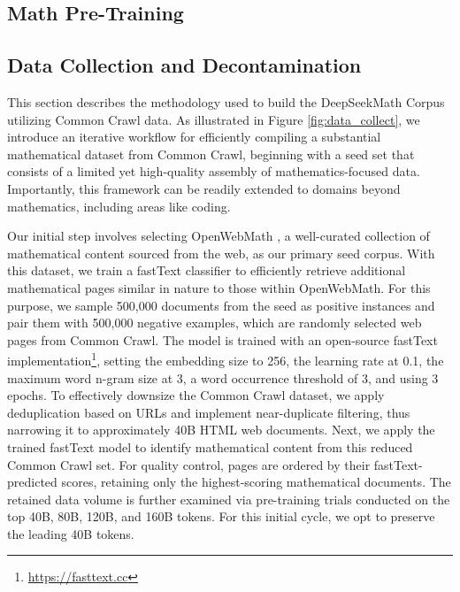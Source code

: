 \begin{itemize}[topsep=0pt]
\section{Math Pre-Training}

\subsection{Data Collection and Decontamination} This section describes the methodology used to build the DeepSeekMath Corpus utilizing Common Crawl data. As illustrated in Figure \ref{fig:data_collect}, we introduce an iterative workflow for efficiently compiling a substantial mathematical dataset from Common Crawl, beginning with a seed set that consists of a limited yet high-quality assembly of mathematics-focused data. Importantly, this framework can be readily extended to domains beyond mathematics, including areas like coding.

Our initial step involves selecting OpenWebMath \citep{openwebmath}, a well-curated collection of mathematical content sourced from the web, as our primary seed corpus. With this dataset, we train a fastText classifier \citep{joulin2016fasttext} to efficiently retrieve additional mathematical pages similar in nature to those within OpenWebMath. For this purpose, we sample 500,000 documents from the seed as positive instances and pair them with 500,000 negative examples, which are randomly selected web pages from Common Crawl. The model is trained with an open-source fastText implementation\footnote{\url{https://fasttext.cc}}, setting the embedding size to 256, the learning rate at 0.1, the maximum word n-gram size at 3, a word occurrence threshold of 3, and using 3 epochs. To effectively downsize the Common Crawl dataset, we apply deduplication based on URLs and implement near-duplicate filtering, thus narrowing it to approximately 40B HTML web documents. Next, we apply the trained fastText model to identify mathematical content from this reduced Common Crawl set. For quality control, pages are ordered by their fastText-predicted scores, retaining only the highest-scoring mathematical documents. The retained data volume is further examined via pre-training trials conducted on the top 40B, 80B, 120B, and 160B tokens. For this initial cycle, we opt to preserve the leading 40B tokens.


\end{itemize}
